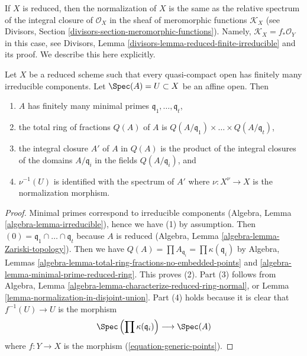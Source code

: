 \noindent
If $X$ is reduced, then the normalization of $X$ is the same
as the relative spectrum of the integral closure of $\mathcal{O}_X$
in the sheaf of meromorphic functions $\mathcal{K}_X$
(see Divisors, Section \ref{divisors-section-meromorphic-functions}).
Namely, $\mathcal{K}_X = f_*\mathcal{O}_Y$ in this case, see
Divisors, Lemma \ref{divisors-lemma-reduced-finite-irreducible}
and its proof. We describe this here explicitly.

\begin{lemma}
\label{lemma-description-normalization}
Let $X$ be a reduced scheme such that every quasi-compact open has
finitely many irreducible components. Let $\Spec(A) = U \subset X$
be an affine open. Then
\begin{enumerate}
\item $A$ has finitely many minimal primes
$\mathfrak q_1, \ldots, \mathfrak q_t$,
\item the total ring of fractions $Q(A)$ of $A$ is
$Q(A/\mathfrak q_1) \times \ldots \times Q(A/\mathfrak q_t)$,
\item the integral closure $A'$ of $A$ in $Q(A)$ is the product of
the integral closures of the domains $A/\mathfrak q_i$
in the fields $Q(A/\mathfrak q_i)$, and
\item $\nu^{-1}(U)$ is identified with the spectrum of $A'$ where
$\nu : X^\nu \to X$ is the normalization morphism.
\end{enumerate}
\end{lemma}

\begin{proof}
Minimal primes correspond to irreducible components
(Algebra, Lemma \ref{algebra-lemma-irreducible}),
hence we have (1) by assumption. Then
$(0) = \mathfrak q_1 \cap \ldots \cap \mathfrak q_t$ because $A$ is reduced
(Algebra, Lemma \ref{algebra-lemma-Zariski-topology}).
Then we have
$Q(A) = \prod A_{\mathfrak q_i} = \prod \kappa(\mathfrak q_i)$
by Algebra, Lemmas \ref{algebra-lemma-total-ring-fractions-no-embedded-points}
and \ref{algebra-lemma-minimal-prime-reduced-ring}.
This proves (2). Part (3) follows from
Algebra, Lemma \ref{algebra-lemma-characterize-reduced-ring-normal},
or Lemma \ref{lemma-normalization-in-disjoint-union}.
Part (4) holds because it is clear that $f^{-1}(U) \to U$ is the morphism
$$
\Spec\left(\prod \kappa(\mathfrak q_i)\right)
\longrightarrow
\Spec(A)
$$
where $f : Y \to X$ is the morphism (\ref{equation-generic-points}).
\end{proof}

